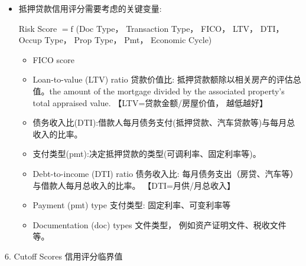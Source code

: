 \begin{itemize}
\begin{itemize}
\end{itemize}



\item 抵押贷款信用评分需要考虑的关键变量:

Risk Score \(= \mathrm{f}\) (Doc Type， Transaction Type， FICO， LTV， DTI， Occup Type， Prop Type， Pmt， Economic Cycle)
\begin{itemize}

\item FICO score

\item Loan-to-value (LTV) ratio 贷款价值比: 抵押贷款额除以相关房产的评估总值。the amount of the mortgage divided by the associated property's total appraised value. 【LTV=贷款金额/房屋价值， 越低越好】

\item 债务收入比(DTI):借款人每月债务支付(抵押贷款、汽车贷款等)与每月总收入的比率。

\item 支付类型(pmt):决定抵押贷款的类型(可调利率、固定利率等)。

\item Debt-to-income (DTI) ratio 债务收入比:  每月债务支出（房贷、汽车等）与借款人每月总收入的比率。 【DTI=月供/月总收入】

\item Payment (pmt) type 支付类型: 固定利率、可变利率等

\item Documentation (doc) types 文件类型， 例如资产证明文件、税收文件等。
\end{itemize}
\end{itemize}

6. Cutoff Scores 信用评分临界值

